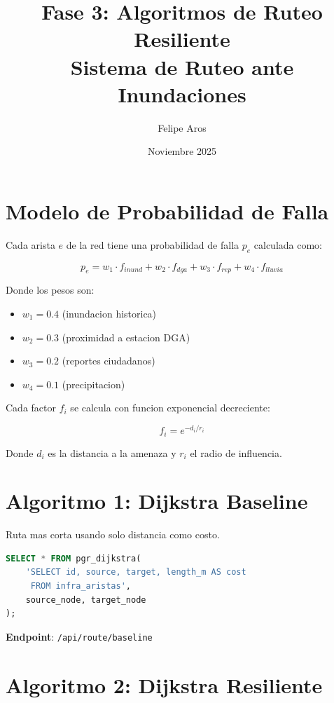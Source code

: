 \documentclass[12pt,a4paper]{article}
\title{Fase 3: Algoritmos de Ruteo Resiliente\\Sistema de Ruteo ante Inundaciones}
\author{Felipe Aros}
\date{Noviembre 2025}
\begin{document}
\maketitle

\section{Modelo de Probabilidad de Falla}

Cada arista $e$ de la red tiene una probabilidad de falla $p_e$ calculada como:

\begin{equation}
p_e = w_1 \cdot f_{inund} + w_2 \cdot f_{dga} + w_3 \cdot f_{rep} + w_4 \cdot f_{lluvia}
\end{equation}

Donde los pesos son:
\begin{itemize}
    \item $w_1 = 0.4$ (inundacion historica)
    \item $w_2 = 0.3$ (proximidad a estacion DGA)
    \item $w_3 = 0.2$ (reportes ciudadanos)
    \item $w_4 = 0.1$ (precipitacion)
\end{itemize}

Cada factor $f_i$ se calcula con funcion exponencial decreciente:

\begin{equation}
f_i = e^{-d_i / r_i}
\end{equation}

Donde $d_i$ es la distancia a la amenaza y $r_i$ el radio de influencia.

\section{Algoritmo 1: Dijkstra Baseline}

Ruta mas corta usando solo distancia como costo.

\begin{lstlisting}[language=SQL]
SELECT * FROM pgr_dijkstra(
    'SELECT id, source, target, length_m AS cost
     FROM infra_aristas',
    source_node, target_node
);
\end{lstlisting}

\textbf{Endpoint}: \texttt{/api/route/baseline}

\section{Algoritmo 2: Dijkstra Resiliente}
\end{document}
